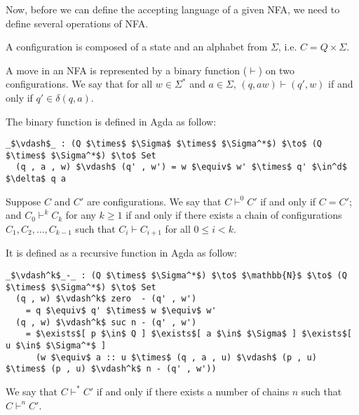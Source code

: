 \par Now, before we can define the accepting language of a given
NFA, we need to define several operations of NFA. 

\begin{defn}
\noindent A configuration is composed of a state and an alphabet from
\(\Sigma\), i.e. \(C = Q \times \Sigma\). 
\end{defn}

\begin{defn}
\noindent A move in an NFA is
represented by a binary function (\(\vdash\)) on two configurations. We say
that for all \(w \in \Sigma^*\) and \(a \in \Sigma\), \((q, aw)
\vdash (q' , w)\) if and only if \(q' \in \delta (q , a)\). 
\end{defn}

\par The binary function is defined in Agda as follow: 
\begin{lstlisting}[mathescape=true,xleftmargin=.3\textwidth]
  _$\vdash$_ : (Q $\times$ $\Sigma$ $\times$ $\Sigma^*$) $\to$ (Q $\times$ $\Sigma^*$) $\to$ Set
  (q , a , w) $\vdash$ (q' , w') = w $\equiv$ w' $\times$ q' $\in^d$ $\delta$ q a
\end{lstlisting}

\begin{defn}
\noindent Suppose \(C\) and \(C'\) are configurations. We say that \(C \vdash^0 C'\) if and only
if \(C = C'\); and \(C_0 \vdash^k C_k\) for any \(k \geq 1\) if and only if there exists a chain of
configurations \(C_1, C_2, ..., C_{k-1}\) such that \(C_i \vdash C_{i+1}\) for all \(0 \leq i < k\). 
\end{defn}

\par It is defined as a recursive function in Agda as follow: 
\begin{lstlisting}[mathescape=true,xleftmargin=.3\textwidth]
  _$\vdash^k$_-_ : (Q $\times$ $\Sigma^*$) $\to$ $\mathbb{N}$ $\to$ (Q $\times$ $\Sigma^*$) $\to$ Set
  (q , w) $\vdash^k$ zero  - (q' , w')
    = q $\equiv$ q' $\times$ w $\equiv$ w'
  (q , w) $\vdash^k$ suc n - (q' , w') 
    = $\exists$[ p $\in$ Q ] $\exists$[ a $\in$ $\Sigma$ ] $\exists$[ u $\in$ $\Sigma^*$ ]
      (w $\equiv$ a :: u $\times$ (q , a , u) $\vdash$ (p , u) $\times$ (p , u) $\vdash^k$ n - (q' , w'))
\end{lstlisting}

\begin{defn}
\noindent We say that \(C \vdash^* C'\) if and only
if there exists a number of chains \(n\) such that \(C \vdash^n C'\). 
\end{defn}

